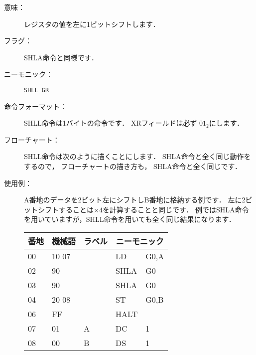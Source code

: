 \begin{description}
\item[意味：]レジスタの値を左に1ビットシフトします．

\item[フラグ：]
  SHLA命令と同様です．

\item[ニーモニック：]\texttt{SHLL  GR}

\item[命令フォーマット：]SHLL命令は1バイトの命令です．
  XRフィールドは必ず $01_2$にします．


\item[フローチャート：]SHLL命令は次のように描くことにします．
  SHLA命令と全く同じ動作をするので，
  フローチャートの描き方も，
  SHLA命令と全く同じです．

  \begin{center}
  \end{center}

\item[使用例：]
  A番地のデータを2ビット左にシフトしB番地に格納する例です．
  左に2ビットシフトすることは$\times 4$を計算することと同じです．
  例ではSHLA命令を用いていますが，SHLL命令を用いても全く同じ結果になります．

  {\ttfamily\begin{center}
    \begin{tabular}{|l|l|l|l l|} \hline
      番地 & 機械語 & ラベル & \multicolumn{2}{|c|}{ニーモニック} \\
      \hline
      00 & 10 07 &   & LD   & G0,A \\
      02 & 90    &   & SHLA & G0   \\
      03 & 90    &   & SHLA & G0   \\
      04 & 20 08 &   & ST   & G0,B \\
      06 & FF    &   & HALT &      \\
      07 & 01    & A & DC   & 1    \\
      08 & 00    & B & DS   & 1    \\
      \hline
    \end{tabular}
  \end{center}}

\end{description}

\newpage
